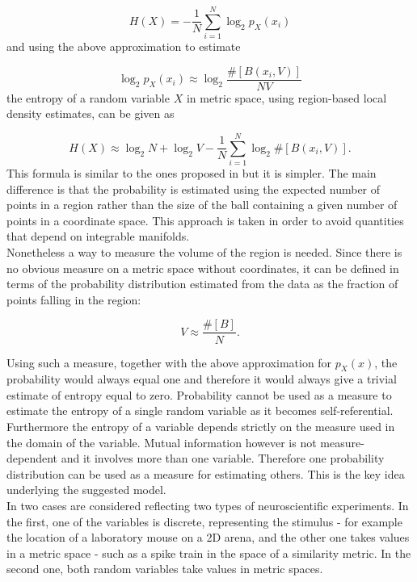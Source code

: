 \documentclass[12pt]{extarticle}
\begin{document}
\begin{equation}
H(X)=-\frac{1}{N}\sum_{i = 1}^{N} \log_2 p_X(x_i)
\end{equation}
and using the above approximation to estimate 

\begin{equation}
\log_2 p_X(x_i) \approx \log_2 \frac{\#[B(x_i,V)]}{NV}
\end{equation}
the entropy of a random variable $X$ in metric space, using region-based
local density estimates, can be given as

\begin{equation}
H(X) \approx \log_2N + \log_2V - \frac{1}{N} \sum_{i = 1}^{N} \log_2\#[B(x_i,V)].
\end{equation}
This formula is similar to the ones proposed in \cite{Kozachenko-Leonenko,Kraskov} but it
is simpler. The main difference is that the probability is estimated
using the expected number of points in a region rather than the size
of the ball containing a given number of points in a coordinate
space. This approach is taken in order to avoid quantities that depend
on integrable manifolds.\\

\noindent
Nonetheless a way to measure the volume of the region is needed. Since there
is no obvious measure on a metric space without coordinates, it can be
defined in terms of the probability distribution estimated from the
data as the fraction of points falling in the region:

\begin{equation}
V\approx \frac{\#[B]}{N}.
\label{eq.vol.est}
\end{equation}

\noindent
Using such a measure, together with the above approximation for
$p_X(x)$, the probability would always equal one and therefore it
would always give a trivial estimate of entropy equal to zero.
Probability cannot be used as a measure to estimate the
entropy of a single random variable as it becomes self-referential.
Furthermore the entropy of a variable depends strictly on the measure
used in the domain of the variable. Mutual information however is not
measure-dependent and it involves more than one variable. Therefore
one probability distribution can be used as a measure for estimating
others. This is the key idea underlying the suggested model.\\

\noindent
In \cite{Houghton} two cases are considered reflecting two types of
neuroscientific experiments. In the first, one of the variables is
discrete, representing the stimulus - for example the location of a 
laboratory mouse on a 2D arena, and the other one
takes values in a metric space - such as a spike train in the space of
a similarity metric. In the second one, both random variables take
values in metric spaces.\\
\end{document}
